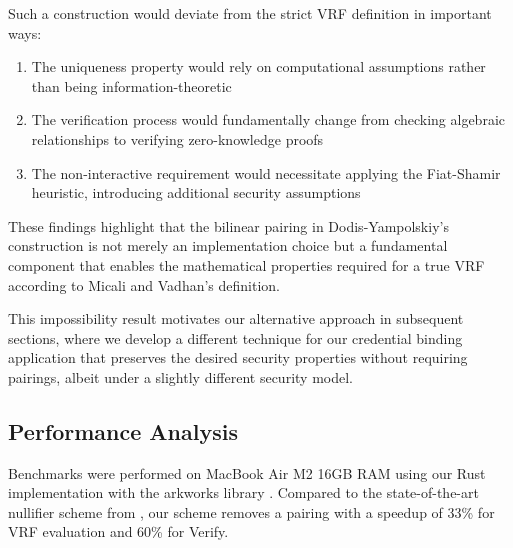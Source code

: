 Such a construction would deviate from the strict VRF definition in important ways:

\begin{enumerate}
    \item The uniqueness property would rely on computational assumptions rather than being information-theoretic
    \item The verification process would fundamentally change from checking algebraic relationships to verifying zero-knowledge proofs
    \item The non-interactive requirement would necessitate applying the Fiat-Shamir heuristic, introducing additional security assumptions
\end{enumerate}

These findings highlight that the bilinear pairing in Dodis-Yampolskiy's construction is not merely an implementation choice but a fundamental component that enables the mathematical properties required for a true VRF according to Micali and Vadhan's definition.

This impossibility result motivates our alternative approach in subsequent sections, where we develop a different technique for our credential binding application that preserves the desired security properties without requiring pairings, albeit under a slightly different security model.
















\subsection{Performance Analysis}
Benchmarks were performed on MacBook Air M2 16GB RAM using our Rust implementation with the arkworks library \cite{arkworks_contributors_arkworks_2022}. Compared to the state-of-the-art nullifier scheme from \cite{tomescu2022utt}, our scheme removes a pairing with a speedup of 33\% for VRF evaluation and 60\% for Verify.

